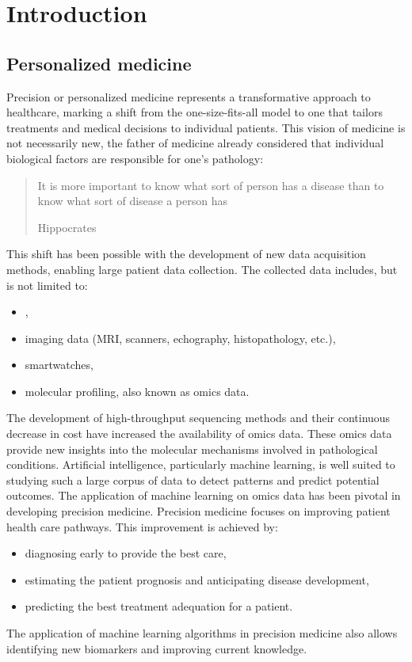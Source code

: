 \documentclass[../main.tex]{subfiles}
\begin{document}

\chapter{Introduction}
\minitoc

\section{Personalized medicine}
	Precision or personalized medicine represents a transformative approach to healthcare, marking a shift from the one-size-fits-all model to one that tailors treatments and medical decisions to individual patients.
	This vision of medicine is not necessarily new, the father of medicine already considered that individual biological factors are responsible for one's pathology: \blockquote[Hippocrates][.]{It is more important to know what sort of person has a disease than to know what sort of disease a person has}.
	This shift has been possible with the development of new data acquisition methods, enabling large patient data collection.
	The collected data includes, but is not limited to:
	\begin{itemize}[nosep]
		\item {},
		\item imaging data (MRI, scanners, echography, histopathology, etc.),
		\item smartwatches,
		\item molecular profiling, also known as omics data.
	\end{itemize}
	The development of high-throughput sequencing methods and their continuous decrease in cost have increased the availability of omics data.
	These omics data provide new insights into the molecular mechanisms involved in pathological conditions.
	Artificial intelligence, particularly machine learning, is well suited to studying such a large corpus of data to detect patterns and predict potential outcomes.
	The application of machine learning on omics data has been pivotal in developing precision medicine.
	Precision medicine focuses on improving patient health care pathways.
	This improvement is achieved by:
	\begin{itemize}[nosep]
		\item diagnosing early to provide the best care,
		\item estimating the patient prognosis and anticipating disease development,
		\item predicting the best treatment adequation for a patient.
	\end{itemize}
	The application of machine learning algorithms in precision medicine also allows identifying new biomarkers and improving current knowledge.
\end{document}
